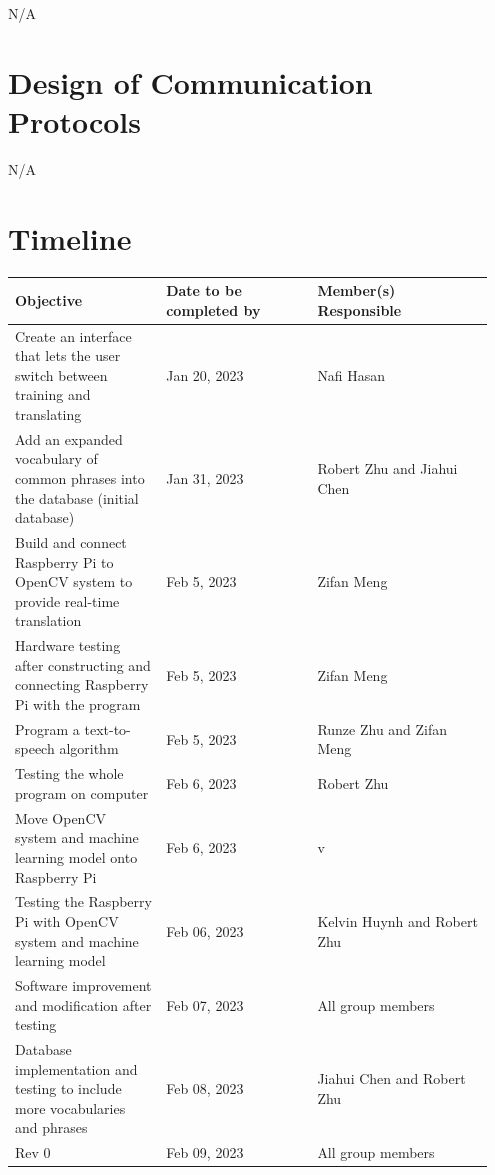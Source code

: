\documentclass[12pt, titlepage]{article}
\begin{document}
N/A

\section{Design of Communication Protocols}

N/A

\section{Timeline}

\renewcommand{\arraystretch}{1.2}
\noindent \begin{tabularx}{\textwidth}{p{0.3\linewidth}|p{0.3\linewidth}|p{0.35\linewidth}}
\toprule
\textbf{Objective} & \textbf{Date to be completed by} & \textbf{Member(s) Responsible}\\
\midrule
Create an interface that lets the user switch between training and translating & Jan 20, 2023 & Nafi Hasan\\
\hline
Add an expanded vocabulary of common phrases into the database (initial database) & Jan 31, 2023 & Robert Zhu and Jiahui Chen\\
\hline
Build and connect Raspberry Pi to OpenCV system to provide real-time translation & Feb 5, 2023 & Zifan Meng\\
\hline
Hardware testing after constructing and connecting Raspberry Pi with the program & Feb 5, 2023 & Zifan Meng\\
\hline
Program a text-to-speech algorithm & Feb 5, 2023 & Runze Zhu and Zifan Meng\\
\hline
Testing the whole program on computer & Feb 6, 2023 & Robert Zhu\\
\hline
Move OpenCV system and machine learning model onto Raspberry Pi & Feb 6, 2023 & v\\
\hline
Testing the Raspberry Pi with OpenCV system and machine learning model & Feb 06, 2023 & Kelvin Huynh and Robert Zhu\\
\hline
Software improvement and modification after testing & Feb 07, 2023 & All group members\\
\hline
Database implementation and testing to include more vocabularies and phrases & Feb 08, 2023 & Jiahui Chen and Robert Zhu\\
\hline
Rev 0 & Feb 09, 2023 & All group members\\
\bottomrule
\end{tabularx}

% 
\end{document}
